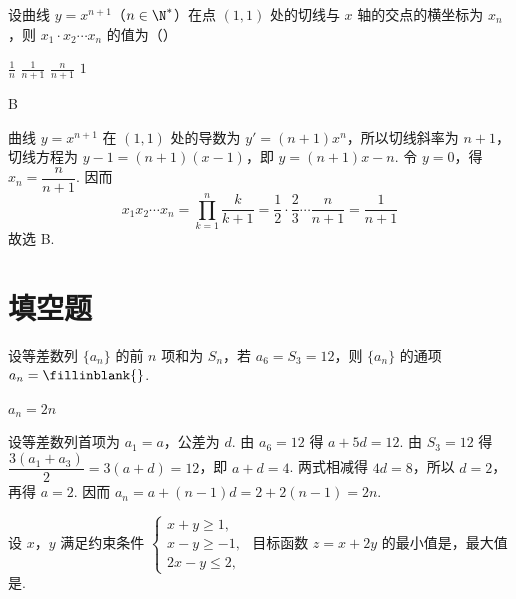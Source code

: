 \begin{problem}
设曲线 \( y = x^{n + 1} \)（\(n \in \N^*\)）在点 \((1,1)\) 处的切线与 \(x\) 轴的交点的横坐标为 \( x_n \)，则 \( x_1 \cdot x_2 \cdots x_n \) 的值为（\quad）

\choices
    {\(\frac{1}{n}\)}
    {\(\frac{1}{n + 1}\)}
    {\(\frac{n}{n + 1}\)}
    {\(1\)}
\end{problem}

\begin{answer}
B
\end{answer}

\begin{solution}
曲线 \(y=x^{n+1}\) 在 \((1,1)\) 处的导数为 \(y'=(n+1)x^{n}\)，所以切线斜率为 \(n+1\)，切线方程为 \(y-1=(n+1)(x-1)\)，即 \(y=(n+1)x-n\). 令 \(y=0\)，得 \(x_{n}=\dfrac{n}{n+1}\). 因而
\[
x_{1}x_{2}\cdots x_{n}=\prod_{k=1}^{n}\dfrac{k}{k+1}=\dfrac{1}{2}\cdot\dfrac{2}{3}\cdots\dfrac{n}{n+1}=\dfrac{1}{n+1}
\]
故选 B.
\end{solution}

\section{填空题}

\begin{problem}
设等差数列 \(\{a_{n}\}\) 的前 \(n\) 项和为 \(S_{n}\)，若 \(a_{6} = S_{3} = 12\)，则 \(\{a_{n}\}\) 的通项 \(a_{n} =\fillinblank{}\).
\end{problem}

\begin{answer}
\(a_{n} = 2n\)
\end{answer}

\begin{solution}
设等差数列首项为 \(a_{1}=a\)，公差为 \(d\). 由 \(a_{6}=12\) 得 \(a+5d=12\). 由 \(S_{3}=12\) 得 \(\dfrac{3(a_{1}+a_{3})}{2}=3(a+d)=12\)，即 \(a+d=4\). 两式相减得 \(4d=8\)，所以 \(d=2\)，再得 \(a=2\). 因而 \(a_{n}=a+(n-1)d=2+2(n-1)=2n\).
\end{solution}

\begin{problem}
设 \(x\)，\(y\) 满足约束条件 \(\begin{cases}
x + y \geqslant 1,\\
x - y \geqslant -1,\\
2x - y \leqslant 2,
\end{cases}\) 目标函数 \(z = x + 2y\) 的最小值是\fillinblank{}，最大值是\fillinblank{}.
\end{problem}

